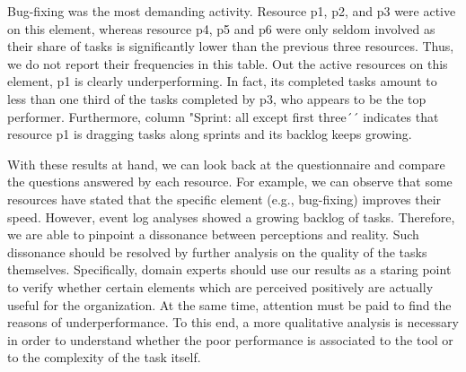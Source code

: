 Bug-fixing was the most demanding activity. Resource p1, p2, and p3 were active on this element, whereas resource p4, p5 and p6 were only seldom involved as their share of tasks is significantly lower than the previous three resources. Thus, we do not report their frequencies in this table. Out the active resources on this element, p1 is clearly underperforming. In fact, its completed tasks amount to less than one third of the tasks completed by p3, who appears to be the top performer. Furthermore, column "Sprint: all except first three´´ indicates that resource p1 is dragging tasks along sprints and its backlog keeps growing. 

With these results at hand, we can look back at the questionnaire and compare the questions answered by each resource. For example, we can observe that some resources have stated that the specific element (e.g., bug-fixing) improves their speed. However, event log analyses showed a growing backlog of tasks. Therefore, we are able to pinpoint a dissonance between perceptions and reality. Such dissonance should be resolved by further analysis on the quality of the tasks themselves. Specifically, domain experts should use our results as a staring point to verify whether certain elements which are perceived positively are actually useful for the organization. At the same time, attention must be paid to find the reasons of underperformance. To this end, a more qualitative analysis is necessary in order to understand whether the poor performance is associated to the tool or to the complexity of the task itself.  

